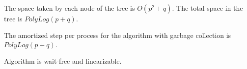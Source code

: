 \begin{corollary}
The space taken by each node of the tree is $O(p^2+q)$. The total space in the tree is $PolyLog(p+q)$.
\end{corollary}

\begin{lemma}
  The amortized step per process for the algorithm with garbage collection is $PolyLog(p+q)$.
\end{lemma}

\begin{lemma}
  Algorithm is wait-free and linearizable.
\end{lemma}

